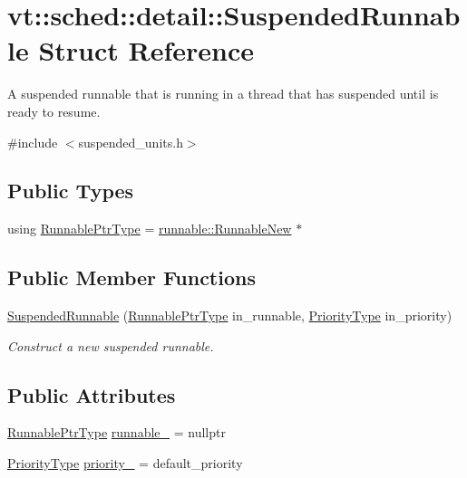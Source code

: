 \hypertarget{structvt_1_1sched_1_1detail_1_1_suspended_runnable}{}\section{vt\+:\+:sched\+:\+:detail\+:\+:Suspended\+Runnable Struct Reference}
\label{structvt_1_1sched_1_1detail_1_1_suspended_runnable}


A suspended runnable that is running in a thread that has suspended until is ready to resume.  




{\ttfamily \#include $<$suspended\+\_\+units.\+h$>$}

\subsection*{Public Types}
\begin{DoxyCompactItemize}
\item 
using \hyperlink{structvt_1_1sched_1_1detail_1_1_suspended_runnable_a537f33a52d34b0372cfa7f52ab2b6524}{Runnable\+Ptr\+Type} = \hyperlink{structvt_1_1runnable_1_1_runnable_new}{runnable\+::\+Runnable\+New} $\ast$
\end{DoxyCompactItemize}
\subsection*{Public Member Functions}
\begin{DoxyCompactItemize}
\item 
\hyperlink{structvt_1_1sched_1_1detail_1_1_suspended_runnable_a2bc6c62d0934ab1f58f1367d62c0e4ef}{Suspended\+Runnable} (\hyperlink{structvt_1_1sched_1_1detail_1_1_suspended_runnable_a537f33a52d34b0372cfa7f52ab2b6524}{Runnable\+Ptr\+Type} in\+\_\+runnable, \hyperlink{namespacevt_a86bff9f556eb761b27fc8600d006ac04}{Priority\+Type} in\+\_\+priority)
\begin{DoxyCompactList}\small\item\em Construct a new suspended runnable. \end{DoxyCompactList}\end{DoxyCompactItemize}
\subsection*{Public Attributes}
\begin{DoxyCompactItemize}
\item 
\hyperlink{structvt_1_1sched_1_1detail_1_1_suspended_runnable_a537f33a52d34b0372cfa7f52ab2b6524}{Runnable\+Ptr\+Type} \hyperlink{structvt_1_1sched_1_1detail_1_1_suspended_runnable_a75e2acf06f06e65bee0f88a14accc1c8}{runnable\+\_\+} = nullptr
\item 
\hyperlink{namespacevt_a86bff9f556eb761b27fc8600d006ac04}{Priority\+Type} \hyperlink{structvt_1_1sched_1_1detail_1_1_suspended_runnable_ab591ea2e254d1f520c775a082f361c68}{priority\+\_\+} = default\+\_\+priority
\end{DoxyCompactItemize}


